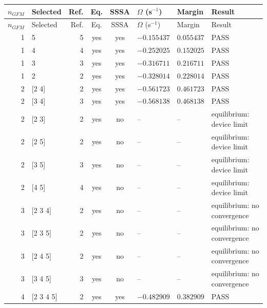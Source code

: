 \begingroup\footnotesize\setlength{\tabcolsep}{1.5pt}
\begin{longtable}{@{}r p{} r c c p{} p{} p{}@{}}
\toprule
$n_{GFM}$ & Selected & Ref. & Eq. & SSSA & $\Omega$ (s$^{-1}$) & Margin & Result \\ \midrule
\endfirsthead
\toprule
$n_{GFM}$ & Selected & Ref. & Eq. & SSSA & $\Omega$ (s$^{-1}$) & Margin & Result \\ \midrule
\endhead
1 & 5 & 5 & yes & yes & $-0.155437$ & $0.055437$ & PASS \\ 
1 & 4 & 4 & yes & yes & $-0.252025$ & $0.152025$ & PASS \\ 
1 & 3 & 3 & yes & yes & $-0.316711$ & $0.216711$ & PASS \\ 
1 & 2 & 2 & yes & yes & $-0.328014$ & $0.228014$ & PASS \\ 
2 & {[}2 4{]} & 2 & yes & yes & $-0.561723$ & $0.461723$ & PASS \\ 
2 & {[}3 4{]} & 3 & yes & yes & $-0.568138$ & $0.468138$ & PASS \\ 
2 & {[}2 3{]} & 2 & yes & no & -- & -- & equilibrium: device limit \\ 
2 & {[}2 5{]} & 2 & yes & no & -- & -- & equilibrium: device limit \\ 
2 & {[}3 5{]} & 3 & yes & no & -- & -- & equilibrium: device limit \\ 
2 & {[}4 5{]} & 4 & yes & no & -- & -- & equilibrium: device limit \\ 
3 & {[}2 3 4{]} & 2 & yes & no & -- & -- & equilibrium: no convergence \\ 
3 & {[}2 3 5{]} & 2 & yes & no & -- & -- & equilibrium: no convergence \\ 
3 & {[}2 4 5{]} & 2 & yes & no & -- & -- & equilibrium: no convergence \\ 
3 & {[}3 4 5{]} & 3 & yes & no & -- & -- & equilibrium: no convergence \\ 
4 & {[}2 3 4 5{]} & 2 & yes & yes & $-0.482909$ & $0.382909$ & PASS \\ 
\bottomrule
\end{longtable}\endgroup
